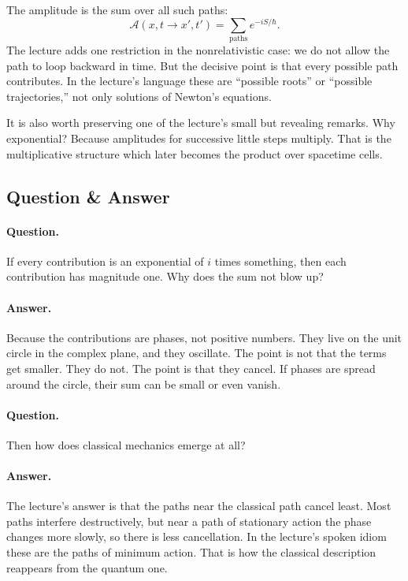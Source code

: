 The amplitude is the sum over all such paths:
\begin{equation}
\mathcal{A}(x,t\to x',t')=\sum_{\text{paths}} e^{-iS/\hbar}.
\end{equation}
The lecture adds one restriction in the nonrelativistic case: we do not allow the path to loop backward in time. But the decisive point is that every possible path contributes. In the lecture's language these are ``possible roots'' or ``possible trajectories,'' not only solutions of Newton's equations.

It is also worth preserving one of the lecture's small but revealing remarks. Why exponential? Because amplitudes for successive little steps multiply. That is the multiplicative structure which later becomes the product over spacetime cells.

\subsection{Question \& Answer}

\paragraph{Question.} If every contribution is an exponential of \(i\) times something, then each contribution has magnitude one. Why does the sum not blow up?

\paragraph{Answer.} Because the contributions are phases, not positive numbers. They live on the unit circle in the complex plane, and they oscillate. The point is not that the terms get smaller. They do not. The point is that they cancel. If phases are spread around the circle, their sum can be small or even vanish.

\paragraph{Question.} Then how does classical mechanics emerge at all?

\paragraph{Answer.} The lecture's answer is that the paths near the classical path cancel least. Most paths interfere destructively, but near a path of stationary action the phase changes more slowly, so there is less cancellation. In the lecture's spoken idiom these are the paths of minimum action. That is how the classical description reappears from the quantum one.

